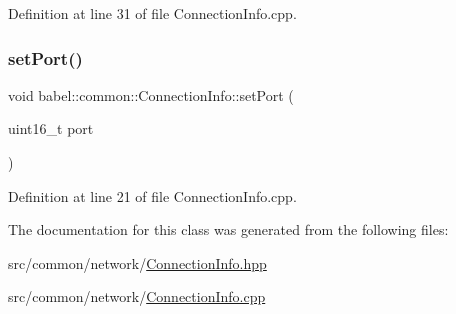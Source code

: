 Definition at line 31 of file Connection\+Info.\+cpp.

\mbox{\label{classbabel_1_1common_1_1_connection_info_ac7dbfe18e710762fbeccca1fe74e3647}} 
\subsubsection{\texorpdfstring{set\+Port()}{setPort()}}
{\footnotesize\ttfamily void babel\+::common\+::\+Connection\+Info\+::set\+Port (\begin{DoxyParamCaption}\item[{uint16\+\_\+t}]{port }\end{DoxyParamCaption})}



Definition at line 21 of file Connection\+Info.\+cpp.



The documentation for this class was generated from the following files\+:\begin{DoxyCompactItemize}
\item 
src/common/network/\mbox{\hyperlink{_connection_info_8hpp}{Connection\+Info.\+hpp}}\item 
src/common/network/\mbox{\hyperlink{_connection_info_8cpp}{Connection\+Info.\+cpp}}\end{DoxyCompactItemize}
